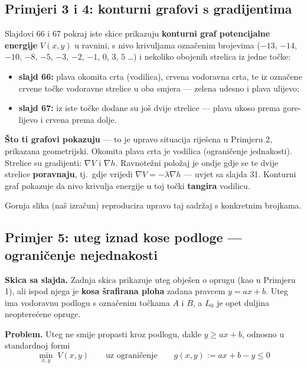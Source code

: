 \subsection{Primjeri 3 i 4: konturni grafovi s gradijentima}

Slajdovi 66 i 67 pokraj iste skice prikazuju \textbf{konturni graf potencijalne
energije} $V(x,y)$ u ravnini, s nivo krivuljama označenim brojevima
($-13$, $-14$, $-10$, $-8$, $-5$, $-3$, $-2$, $-1$, $0$, $3$, $5$ \dots) i
nekoliko obojenih strelica iz jedne točke:

\begin{itemize}
  \item \textbf{slajd 66:} plava okomita crta (vodilica), crvena vodoravna
        crta, te iz označene crvene točke vodoravne strelice u oba smjera ---
        zelena udesno i plava ulijevo;
  \item \textbf{slajd 67:} iz iste točke dodane su još dvije strelice --- plava
        ukoso prema gore-lijevo i crvena prema dolje.
\end{itemize}

\textbf{Što ti grafovi pokazuju} --- to je upravo situacija riješena u Primjeru
2, prikazana geometrijski. Okomita plava crta je vodilica (ograničenje
jednakosti). Strelice su gradijenti: $\nabla V$ i $\nabla h$. Ravnotežni
položaj je ondje gdje se te dvije strelice \textbf{poravnaju}, tj.\ gdje
vrijedi $\nabla V = -\lambda\nabla h$ --- uvjet sa slajda 31. Konturni graf
pokazuje da nivo krivulja energije u toj točki \textbf{tangira} vodilicu.

Gornja slika (naš izračun) reproducira upravo taj sadržaj s konkretnim
brojkama.

\subsection{Primjer 5: uteg iznad kose podloge --- ograničenje nejednakosti}

\textbf{Skica sa slajda.} Zadnja skica prikazuje uteg obješen o oprugu (kao u
Primjeru 1), ali ispod njega je \textbf{kosa šrafirana ploha} zadana pravcem
$y = ax + b$. Uteg ima vodoravnu podlogu s označenim točkama $A$ i $B$, a
$L_0$ je opet duljina neopterećene opruge.

\textbf{Problem.} Uteg ne smije propasti kroz podlogu, dakle $y \ge ax + b$,
odnosno u standardnoj formi
\begin{equation}
\label{eq:kosina}
\min_{x,y}\; V(x,y) \qquad\text{uz ograničenje}\qquad
g(x,y) := ax + b - y \le 0
\end{equation}

